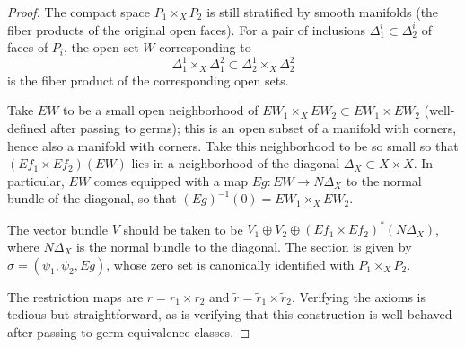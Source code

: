 \documentclass{memo-l}
\theoremstyle{definition}
\theoremstyle{remark}
\numberwithin{section}{chapter}
\numberwithin{equation}{chapter}
\begin{document}

\begin{proof}
The compact space $P_1 \times_X P_2$ is still stratified by smooth manifolds (the fiber products of the original open faces). For a pair of inclusions $\Delta_1^i \subset \Delta_2^i$ of faces of $P_i$, the open set $W$ corresponding to $$\Delta_1^1 \times_X \Delta_1^2 \subset \Delta_2^1 \times_X \Delta_2^2$$ is the fiber product of the corresponding open sets. 

Take $EW$ to be a small open neighborhood of $EW_1 \times_X EW_2 \subset EW_1 \times EW_2$ (well-defined after passing to germs); this is an open subset of a manifold with corners, hence also a manifold with corners. Take this neighborhood to be so small so that $(Ef_1 \times Ef_2)(EW)$ lies in a neighborhood of the diagonal $\Delta_X \subset X \times X$. In particular, $EW$ comes equipped with a map $Eg: EW \to N\Delta_X$ to the normal bundle of the diagonal, so that $(Eg)^{-1}(0) = EW_1 \times_X EW_2$. 

The vector bundle $V$ should be taken to be $V_1 \oplus V_2 \oplus (Ef_1 \times Ef_2)^*(N \Delta_X)$, where $N\Delta_X$ is the normal bundle to the diagonal. The section is given by $\sigma = (\psi_1, \psi_2, Eg)$, whose zero set is canonically identified with $P_1 \times_X P_2$. 

The restriction maps are $r = r_1 \times r_2$ and $\widetilde r = \widetilde r_1 \times \widetilde r_2$. Verifying the axioms is tedious but straightforward, as is verifying that this construction is well-behaved after passing to germ equivalence classes. 
\end{proof}
\end{document}
